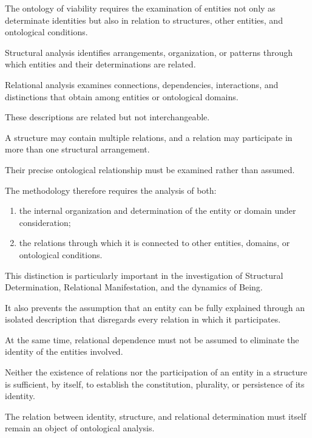 The ontology of viability requires
the examination of entities not
only as determinate identities but
also in relation to structures,
other entities, and ontological
conditions.

Structural analysis identifies
arrangements, organization, or
patterns through which entities
and their determinations are related.

Relational analysis examines
connections, dependencies, interactions,
and distinctions that obtain among
entities or ontological domains.

These descriptions are related
but not interchangeable.

A structure may contain multiple
relations, and a relation may
participate in more than one
structural arrangement.

Their precise ontological relationship
must be examined rather than assumed.

The methodology therefore requires
the analysis of both:

\begin{enumerate}

    \item the internal organization
    and determination of the entity
    or domain under consideration;

    \item the relations through which
    it is connected to other entities,
    domains, or ontological conditions.

\end{enumerate}

This distinction is particularly
important in the investigation of
Structural Determination, Relational
Manifestation, and the dynamics
of Being.

It also prevents the assumption
that an entity can be fully explained
through an isolated description
that disregards every relation
in which it participates.

At the same time, relational
dependence must not be assumed
to eliminate the identity of
the entities involved.

Neither the existence of relations
nor the participation of an entity
in a structure is sufficient,
by itself, to establish the
constitution, plurality, or
persistence of its identity.

The relation between identity,
structure, and relational determination
must itself remain an object
of ontological analysis.


